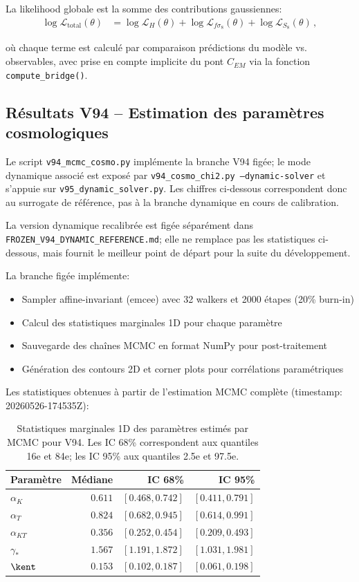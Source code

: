 La likelihood globale est la somme des contributions gaussiennes:
\begin{align}
\log \mathcal{L}_{\text{total}}(\theta) 
  &= \log \mathcal{L}_H(\theta) + \log \mathcal{L}_{f\sigma_8}(\theta) + \log \mathcal{L}_{S_8}(\theta) \, ,
\end{align}

où chaque terme est calculé par comparaison prédictions du modèle vs. observables,
avec prise en compte implicite du pont $C_{EM}$ via la fonction \texttt{compute\_bridge()}.

\subsection*{Résultats V94 -- Estimation des paramètres cosmologiques}

Le script \texttt{v94\_mcmc\_cosmo.py} implémente la branche V94 figée; le mode dynamique associé est exposé par \texttt{v94\_cosmo\_chi2.py --dynamic-solver} et s'appuie sur \texttt{v95\_dynamic\_solver.py}. Les chiffres ci-dessous correspondent donc au surrogate de référence, pas à la branche dynamique en cours de calibration.

La version dynamique recalibrée est figée séparément dans \texttt{FROZEN\_V94\_DYNAMIC\_REFERENCE.md}; elle ne remplace pas les statistiques ci-dessous, mais fournit le meilleur point de départ pour la suite du développement.

La branche figée implémente:
\begin{itemize}
\item Sampler affine-invariant (emcee) avec 32 walkers et 2000 étapes (20\% burn-in)
\item Calcul des statistiques marginales 1D pour chaque paramètre
\item Sauvegarde des chaînes MCMC en format NumPy pour post-traitement
\item Génération des contours 2D et corner plots pour corrélations paramétriques
\end{itemize}

Les statistiques obtenues à partir de l'estimation MCMC complète (timestamp: 20260526-174535Z):

\begin{table}[h]
\centering
\small
\begin{tabular}{lrrr}
\hline
Paramètre & Médiane & IC 68\% & IC 95\% \\
\hline
$\alpha_K$ & $0.611$ & $[0.468, 0.742]$ & $[0.411, 0.791]$ \\
$\alpha_T$ & $0.824$ & $[0.682, 0.945]$ & $[0.614, 0.991]$ \\
$\alpha_{KT}$ & $0.356$ & $[0.252, 0.454]$ & $[0.209, 0.493]$ \\
$\gamma_*$ & $1.567$ & $[1.191, 1.872]$ & $[1.031, 1.981]$ \\
$\kent$ & $0.153$ & $[0.102, 0.187]$ & $[0.061, 0.198]$ \\
\hline
\end{tabular}
\caption{Statistiques marginales 1D des paramètres estimés par MCMC pour V94. Les IC 68\% correspondent aux quantiles 16e et 84e; les IC 95\% aux quantiles 2.5e et 97.5e.}
\end{table}


